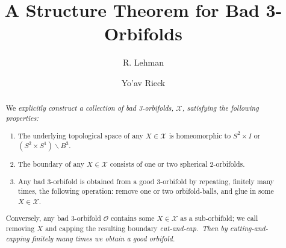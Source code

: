 \documentclass[12pt,reqno]{amsart}
\theoremstyle{plain}
\theoremstyle{definition}
\numberwithin{subcase}{case}
\theoremstyle{plain}
\theoremstyle{definition}
\newcommand{\OO}{\mathcal{O}}
\begin{document}

\title[A Structure Theorem for Bad 3-Orbifolds]{A Structure Theorem for Bad 3-Orbifolds}





\author[R. Lehman]{R. Lehman}
\author[Yo'av Rieck]{Yo'av Rieck}
\address{Dept.\ of Mathematics \\
  University of Arkansas\\
  Fayetteville, AR 72701}

\newif\ifDraft
\Draftfalse

\begin{abstract}
We \em explicitly \em construct a collection of bad 3-orbifolds, \(\mathcal{X}\), satisfying the following properties:
	\begin{enumerate}
	\item The underlying topological space of any \(X \in \mathcal{X}\) is homeomorphic to $S^2\times I$ or $(S^2\times S^1)\backslash B^3$.
	\item The boundary of any \(X \in \mathcal{X}\) consists of one or two spherical 2-orbifolds.
	\item Any bad 3-orbifold is obtained from a good 3-orbifold by repeating, finitely many times, the following operation: remove one or two orbifold-balls, and glue in some \(X \in \mathcal{X}\). 
	\end{enumerate}
 Conversely, any bad 3-orbifold \(\OO\) contains some \(X \in \mathcal{X}\) as a sub-orbifold; we call removing \(X\) and capping the resulting boundary \em cut-and-cap.\em\ Then by cutting-and-capping finitely many times we obtain a good orbifold.

\ifDraft
\textcolor{orange}{{\tiny
having the following property: given any bad 3-orbifold, $\OO$, it admits an embedded suborbifold $X\in\mathcal{X}$ such that after removing this member from $\OO$, and capping the resulting boundary, and then iterating this process finitely many times, you obtain a good 3-orbifold. 
Reversing this process gives us a procedure to obtain any possible bad 3-orbifold starting with a good 3-orbifold. 
Each member of $\mathcal{X}$ has 1 or 2 spherical boundary components and has underlying topological space $S^2\times I$ or $(S^2\times S^1)\backslash B^3$. }}
\fi
\end{abstract}
\end{document}
